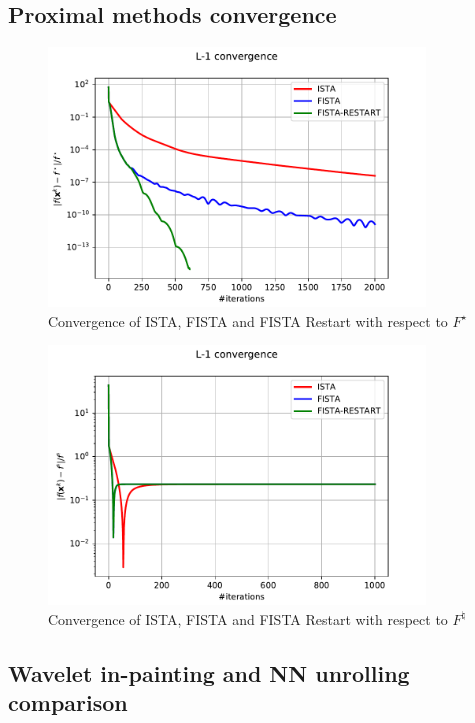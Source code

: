 \documentclass[12pt]{article}
\begin{document}
\subsection{Proximal methods convergence}

\begin{figure}
    \centering
    \includegraphics[width=10cm]{hw3/codes/exercise2/results/f_star_convergence.pdf}
    \caption{Convergence of ISTA, FISTA and FISTA Restart with respect to $F^\star$}
    \label{fig:f-star-convergence}
\end{figure}

\begin{figure}
    \centering
    \includegraphics[width=10cm]{hw3/codes/exercise2/results/f_natural_convergence.pdf}
    \caption{Convergence of ISTA, FISTA and FISTA Restart with respect to $F^\natural$}
    \label{fig:f-natural-convergence}
\end{figure}

\subsection{Wavelet in-painting and NN unrolling comparison}
\end{document}
